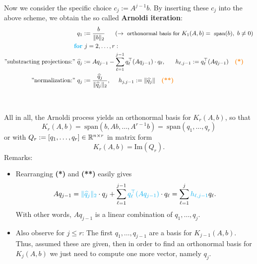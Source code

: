 \begin{frame}
	Now we consider the specific choice $c_j:= A^{j-1}b$. By inserting these $c_j$ into the above scheme, we obtain the so called \textbf{\color{defgruen}Arnoldi iteration}:\\
	\begin{align*}
	q_1&:=\frac{b}{\|b\|_2}~~~~~{\small(\rightarrow~\text{orthonormal basis for}~K_1(A,b)=~\text{span}(b),~b\neq 0)}\\
	\textbf{\color{cyan}for}&~j=2,\ldots, r:\\
	\text{''substracting projections:''}~\widehat{q}_j&:=Aq_{j-1}-\sum_{\ell=1}^{j-1}q_\ell^\top(Aq_{j-1}) \cdot q_\ell,~~~~~h_{\ell,j-1}:= q_\ell^\top(Aq_{j-1})~~~\textbf{\color{orange}(*)} \\
	\text{''normalization:''}~q_j&:=\frac{\widehat{q}_j}{\|\widehat{q}_j\|_2},~~~~h_{j,j-1} :=\|\widehat{q}_j\|~~~\textbf{\color{orange}(**)} 
	\end{align*}
	~\\~\\
All in all, the Arnoldi process yields an orthonormal basis for $K_r(A,b)$, so that
	$$
	K_r(A,b)=~\text{span}(b,Ab,\dots,A^{r-1}b)=~\text{span}(q_1,\dots,q_r)
	$$
or with $Q_r := [q_1,\ldots, q_r] \in {\mathbb{R}}^{n\times r}$ in matrix form
$$K_r(A,b) = \text{Im}(Q_r)  .$$
\footnotesize
Remarks:
\begin{itemize}
	\item Rearranging \textbf{\color{orange}(*)} and \textbf{\color{orange}(**)} easily gives $$Aq_{j-1}={\color{cyan}\|\widehat{q}_j\|_2}\cdot q_j+\sum_{\ell=1}^{j-1}{\color{cyan}q_\ell^\top(Aq_{j-1})} \cdot q_\ell = \sum_{\ell=1}^j {\color{cyan}h_{\ell,j-1}}  q_\ell .$$ 
	With other words, $Aq_{j-1}$ is a linear combination of $q_1,\ldots, q_j$.
	\item Also observe for $j\leq r$: The first $q_1,\ldots, q_{j-1}$ are a basis for $K_{j-1}(A,b)$. Thus, assumed these are given, then in order to find an orthonormal basis for $K_{j}(A,b)$ we just need to compute one more vector, namely $q_j$. 
\end{itemize}
 
\end{frame}
 



